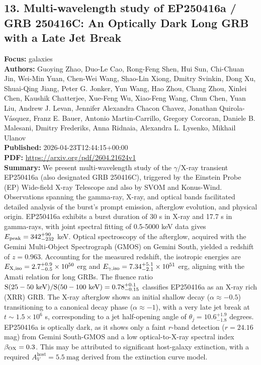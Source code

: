\documentclass[11pt]{article}
\begin{document}
\subsection*{13. Multi-wavelength study of EP250416a / GRB 250416C: An Optically Dark Long GRB with a Late Jet Break}
\textbf{Focus:} galaxies\\
\textbf{Authors:} Guoying Zhao, Duo-Le Cao, Rong-Feng Shen, Hui Sun, Chi-Chuan Jin, Wei-Min Yuan, Chen-Wei Wang, Shao-Lin Xiong, Dmitry Svinkin, Dong Xu, Shuai-Qing Jiang, Peter G. Jonker, Yun Wang, Hao Zhou, Chang Zhou, Xinlei Chen, Kaushik Chatterjee, Xue-Feng Wu, Xiao-Feng Wang, Chun Chen, Yuan Liu, Andrew J. Levan, Jennifer Alexandra Chacon Chavez, Jonathan Quirola-Vásquez, Franz E. Bauer, Antonio Martin-Carrillo, Gregory Corcoran, Daniele B. Malesani, Dmitry Frederiks, Anna Ridnaia, Alexandra L. Lysenko, Mikhail Ulanov\\
\textbf{Published:} 2026-04-23T12:44:15+00:00\\
\textbf{PDF:} \href{https://arxiv.org/pdf/2604.21624v1}{https://arxiv.org/pdf/2604.21624v1}\\
\textbf{Summary:}
We present multi-wavelength study of the $\gamma $/X-ray transient EP250416a (also designated GRB 250416C), triggered by the Einstein Probe (EP) Wide-field X-ray Telescope and also by SVOM and Konus-Wind. Observations spanning the gamma-ray, X-ray, and optical bands facilitated detailed analysis of the burst's prompt emission, afterglow evolution, and physical origin. EP250416a exhibits a burst duration of 30 s in X-ray and 17.7 s in gamma-rays, with joint spectral fitting of 0.5-5000 keV data gives $E\rm_{peak}=342_{-232}^{+90}$ keV. Optical spectroscopy of the afterglow, acquired with the Gemini Multi-Object Spectrograph (GMOS) on Gemini South, yielded a redshift of $z=0.963$. Accounting for the measured redshift, the isotropic energies are $E\rm_{X,iso}=2.7_{-0.5}^{+0.9}\times10^{50}$ erg and $E\rm_{\gamma ,iso}=7.34_{-2.1}^{+5.1}\times10^{51}$ erg, aligning with the Amati relation for long GRBs. The fluence ratio $\rm S(25-50~keV)/S(50-100~keV)=0.78_{-0.15}^{+0.1}$ classifies EP250416a as an X-ray rich (XRR) GRB. The X-ray afterglow shows an initial shallow decay ($\alpha \approx -0.5$) transitioning to a canonical decay phase ($\alpha \approx -1$), with a very late jet break at $t\sim 1.5\times 10^6$ s, corresponding to a jet half-opening angle of $\theta _j=10.6_{-1.8}^{+1.9}$ degrees. EP250416a is optically dark, as it shows only a faint $r$-band detection ($r=24.16$ mag) from Gemini South-GMOS and a low optical-to-X-ray spectral index $\beta _{\rm OX} = 0.3$. This may be attributed to significant host-galaxy extinction, with a required $A_V^{\text{host}}=5.5\ \text{mag}$ derived from the extinction curve model.
\end{document}
